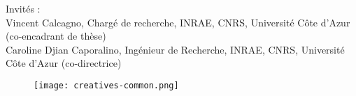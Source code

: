 \begin{titlepage}
\begin{minipage}[t]{1\linewidth}
Invités :\\
Vincent Calcagno, Chargé de recherche, INRAE, CNRS, Université Côte d'Azur (co-encadrant de thèse)\\
Caroline Djian Caporalino, Ingénieur de Recherche, INRAE,  CNRS, Université Côte d'Azur (co-directrice)\\

\end{minipage}
				\begin{figure}[b]
    \texttt{[image: creatives-common.png]}
\end{figure}	
\restoregeometry



					
	\end{titlepage}
